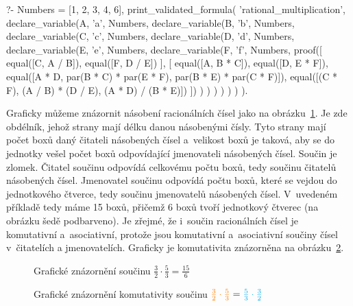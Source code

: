 \begin{prolog}
?-	Numbers = [1, 2, 3, 4, 6],
	print_validated_formula(
		'rational_multiplication',
		declare_variable(A, 'a', Numbers,
			declare_variable(B, 'b', Numbers,
				declare_variable(C, 'c', Numbers,
					declare_variable(D, 'd', Numbers,
						declare_variable(E, 'e', Numbers,
							declare_variable(F, 'f', Numbers,
								proof([
									equal([C, A / B]),
									equal([F, D / E])
								],
								[
									equal([A, B * C]),
									equal([D, E * F]),
									equal([A * D, par(B * C) * par(E * F), par(B * E) * par(C * F)]),
									equal([(C * F), (A / B) * (D / E), (A * D) / (B * E)])
								])
							)
						)
					)
				)
			)
		)
	).
\end{prolog}

Graficky můžeme znázornit násobení racionálních čísel jako na obrázku~\ref{img:rational_multiplication_definition}.
Je zde obdélník, jehož strany mají délku danou násobenými čísly. Tyto strany mají počet boxů daný čitateli násobených čísel a~velikost boxů je taková, aby se do jednotky vešel počet boxů odpovídající jmenovateli násobených čísel. Součin je zlomek. Čitatel součinu odpovídá celkovému počtu boxů, tedy součinu čitatelů násobených čísel. Jmenovatel součinu odpovídá počtu boxů, které se vejdou do jednotkového čtverce, tedy součinu jmenovatelů násobených čísel. V~uvedeném příkladě tedy máme 15 boxů, přičemž 6 boxů tvoří jednotkový čtverec (na obrázku šedě podbarveno). Je zřejmé, že i~součin racionálních čísel je komutativní a~asociativní, protože jsou komutativní a~asociativní součiny čísel v~čitatelích a jmenovatelích. Graficky je komutativita znázorněna na obrázku~\ref{img:rational_multiplication_comutativity}.

\begin{figure}[!h]
\centering
{}
\caption{Grafické znázornění součinu \(\frac{3}{2} \cdot \frac{5}{3} = \frac{15}{6}\)}
\label{img:rational_multiplication_definition}
\end{figure}


\begin{figure}[!h]
\centering
{}
\caption{Grafické znázornění komutativity součinu \(\textcolor{orange}{\frac{3}{2} \cdot \frac{5}{3}} = \textcolor{cyan}{\frac{5}{3} \cdot \frac{3}{2}}\)}
\label{img:rational_multiplication_comutativity}
\end{figure}

